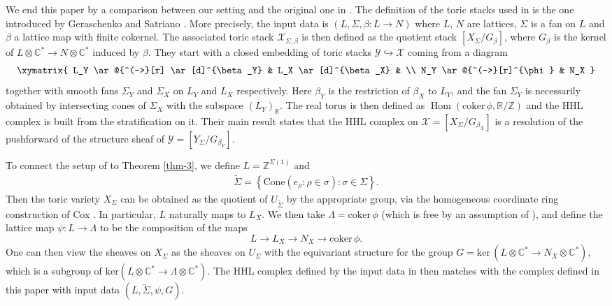 \documentclass[11pt,reqno]{amsart}
\def\C {{\mathbb C}}
\def\R {{\mathbb R}}
\def\Z {{\mathbb Z}}
\theoremstyle{definition}
\numberwithin{equation}{section}
\begin{document}
We end this paper by a comparison between our setting and the original one in \cite{HHL}. The definition of the toric stacks used in \cite{HHL} is the one introduced by Geraschenko and Satriano \cite{GS}. More precisely, the input data is $(L,\Sigma,\beta:L\rightarrow N)$ where $L$, $N$ are lattices, $\Sigma$ is a fan on $L$ and $\beta$ a lattice map with finite cokernel. The associated toric stack $\mathcal{X}_{\Sigma,\beta}$ is then defined as the quotient stack $[X_{\Sigma}/G_{\beta}]$, where $G_{\beta}$ is the kernel of $L\otimes\C^*\rightarrow N\otimes\C^*$ induced by $\beta$. They start with a closed embedding of toric stacks $\mathcal{Y}\hookrightarrow \mathcal{X}$ coming from a diagram
\begin{align*}
    \xymatrix{
        L_Y \ar@{^(->}[r] \ar[d]^{\beta_Y} & L_X \ar[d]^{\beta_X} & \\
        N_Y \ar@{^(->}[r]^{\phi} & N_X 
    }
\end{align*}
together with smooth fans $\Sigma_Y$ and $\Sigma_X$ on $L_Y$ and $L_X$ respectively. Here $\beta_Y$ is the restriction of $\beta_X$ to $L_Y$, and the fan $\Sigma_Y$ is necessarily obtained by intersecting cones of $\Sigma_X$ with the subspace $(L_Y)_{\R}$. The real torus is then defined as $\operatorname{Hom}(\mathrm{coker}\,\phi, \R/\Z)$ and the HHL complex is built from the stratification on it. Their main result states that the HHL complex on $\mathcal{X}=[X_{\Sigma}/G_{\beta_X}]$ is a resolution of the pushforward of the structure sheaf of $\mathcal{Y}=[Y_{\Sigma}/G_{\beta_Y}]$.

\smallskip

To connect the setup of \cite{HHL} to Theorem \ref{thm-3}, we define 
$L = \Z^{\Sigma(1)}$ and
\begin{align*}
    \widetilde{\Sigma} = \left\{ \mathrm{Cone}(e_{\rho}:\rho\in \sigma) : \sigma\in\Sigma \right\}.
\end{align*}
Then the toric variety $X_\Sigma$ can be obtained as the quotient of $U_{  \widetilde{\Sigma} }$ by the appropriate group,
via the homogeneous coordinate ring construction of Cox \cite{Cox}. In particular, $L$ naturally maps to $L_X$. We then take $\Lambda = \mathrm{coker}\,\phi$ (which is free by an assumption of \cite{HHL}), and define the lattice map $\psi:L\to \Lambda$ to be the composition of the maps
 $$L\rightarrow L_X\rightarrow N_X\rightarrow \mathrm{coker}\,\phi.$$
One can then view the sheaves on $X_\Sigma$ as the sheaves on $U_\Sigma$ with the equivariant structure for the group $G= \mathrm{ker}\,(L \otimes \C^* \rightarrow N_X \otimes \C^*)$, which is a subgroup of  $\mathrm{ker}(L\otimes\C^*\rightarrow\Lambda\otimes\C^*)$.
The HHL complex defined by the input data in \cite{HHL} then matches with the complex defined in this paper with input data $(L,\widetilde{\Sigma},\psi,G)$.
\end{document}
